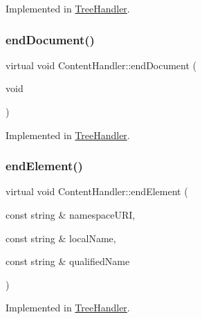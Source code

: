 Implemented in \mbox{\hyperlink{class_tree_handler_a40a58757a18ccf3b2b272d49b5478893}{Tree\+Handler}}.

\mbox{\label{class_content_handler_a21fb351a3987017008caafcc2c60834b}} 
\subsubsection{\texorpdfstring{endDocument()}{endDocument()}}
{\footnotesize\ttfamily virtual void Content\+Handler\+::end\+Document (\begin{DoxyParamCaption}\item[{void}]{ }\end{DoxyParamCaption})\hspace{0.3cm}{\ttfamily [pure virtual]}}



Implemented in \mbox{\hyperlink{class_tree_handler_abe5bde3cb1ac0f928ddfef83921f455f}{Tree\+Handler}}.

\mbox{\label{class_content_handler_a83a93a2fec8354b96e7ea462e65545af}} 
\subsubsection{\texorpdfstring{endElement()}{endElement()}}
{\footnotesize\ttfamily virtual void Content\+Handler\+::end\+Element (\begin{DoxyParamCaption}\item[{const string \&}]{namespace\+U\+RI,  }\item[{const string \&}]{local\+Name,  }\item[{const string \&}]{qualified\+Name }\end{DoxyParamCaption})\hspace{0.3cm}{\ttfamily [pure virtual]}}



Implemented in \mbox{\hyperlink{class_tree_handler_a1db61f3d4f1425dcdd82166ea636fd4f}{Tree\+Handler}}.

\mbox{\label{class_content_handler_a8eb3c33c544eca57340d7dd61396f399}} 
